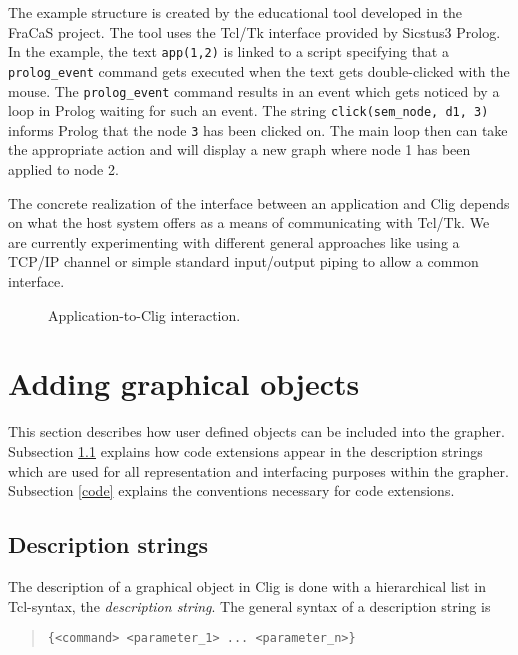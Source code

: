 The example structure is created by the educational tool developed in
the FraCaS project. The tool uses the {\sc Tcl/Tk} interface provided
by {\sc Sicstus3} Prolog. In the example, the text {\tt app(1,2)} is
linked to a script specifying that a
\verb'prolog_event' command gets executed when the text gets
double-clicked with the mouse. The \verb'prolog_event' command results
in an event which gets noticed by a loop in Prolog waiting for such an
event. The string \verb'click(sem_node, d1, 3)' informs Prolog that the
node {\tt 3} has been clicked on. The main loop then can take the
appropriate action and will display a new graph where node 1 has been
applied to node 2.

The concrete realization of the interface between an application and
{\sc Clig} depends on what the host system offers as a means of
communicating with {\sc Tcl/Tk}. We are currently experimenting with
different general approaches like using a TCP/IP channel or simple
standard input/output piping to allow a common interface.


\begin{figure}[H]
\begin{center}
\leavevmode
{}
\caption{Application-to-Clig interaction.}
\label{archy1}
\end{center}
\end{figure}

\section{Adding graphical objects}
\label{extend}

This section describes how user defined objects can be included into
the grapher. Subsection \ref{descr} explains how code extensions
appear in the description strings which are used for all
representation and interfacing purposes within the grapher. Subsection
\ref{code} explains the conventions necessary for code extensions.

\subsection{Description strings}
\label{descr}

The description of a graphical object in {\sc Clig} is done with a
hierarchical list in {\sc Tcl}-syntax, the {\em description
string}. The general syntax of a description string is

\begin{quote}
\begin{verbatim}
{<command> <parameter_1> ... <parameter_n>}
\end{verbatim}
\end{quote}

